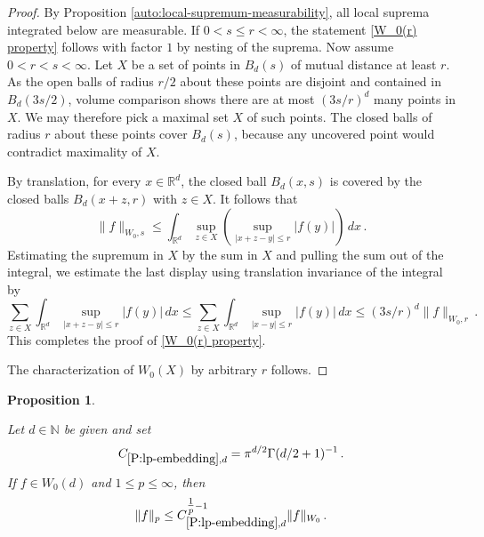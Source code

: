 \documentclass[12pt,reqno]{amsart}
\theoremstyle{plain}
\newtheorem{proposition}[theorem]{Proposition}
\numberwithin{equation}{section}
\theoremstyle{remark}
\newcommand{\uses}[1]{}
\newcommand{\usesdefs}[1]{}
\newcommand{\leanok}{}
\newcommand{\lean}[1]{}
\newcommand{\R}{{\mathbb R}}
\newcommand{\N}{{\mathbb N}}
\begin{document}
\begin{proof}
By Proposition \ref{auto:local-supremum-measurability}, all local suprema integrated below are measurable. If $0<s\le r<\infty$, the statement \eqref{W_0(r) property} follows with factor $1$  by nesting of the suprema. Now assume $0<r<s<\infty.$
Let $X$ be a set of points in $B_d(s)$ of
mutual distance at least $r$. As the open balls of radius $r/2$ about these points are disjoint and contained in $B_d(3s/2)$, volume comparison shows there
are at most $(3s/r)^d$ many points in $X$.
We may therefore pick a maximal set $X$ of such points. The closed balls of radius $r$ about these
points cover $B_d(s)$, because any uncovered point would contradict maximality of $X$.

By translation, for every $x\in \R^d$,
the closed ball $B_d(x,s)$ is covered by the closed balls
$B_d(x+z,r)$ with $z\in X$. It follows that
\begin{equation*}
    \|f\|_{W_0,s}\le \int_{\R^d} \sup_{z\in X} \left(\sup_{|x+z-y|\le r} |f(y)|\right)\,dx\, .
\end{equation*}
Estimating the supremum in $X$ by the sum in $X$ and pulling the sum out of the integral, we estimate the last display using translation invariance of the integral by
\begin{equation*}
         \sum_{z\in X} \int_{\R^d} \sup_{|x+z-y|\le r} |f(y)|\,dx \le \sum_{z\in X} \int_{\R^d} \sup_{|x-y|\le r} |f(y)|\,dx\le (3s/r)^d \|f\|_{W_0,r}\, .
\end{equation*}
This completes the proof of \eqref{W_0(r) property}.


The characterization of $W_0(X)$ by arbitrary $r$ follows.


\end{proof}


\begin{proposition}\label{P:lp-embedding}\uses{}\usesdefs{closed ball,auto:Wiener-space-definition}
\lean{Auto.MemW0.memLp}
\leanok
Let $d\in \N$ be given and set
\begin{equation}\label{auto:Wiener-Lp-embedding-constant}
    C_{\ref{P:lp-embedding},d}=\pi^{d/2}\Gamma(d/2+1)^{-1}\, .
\end{equation}
If $f\in W_0(d)$ and $1\le p\le \infty$, then
\begin{equation}\label{Lp W_0}
\|f\|_p\le C_{\ref{P:lp-embedding},d}^{\tfrac 1p -1}\|f\|_{W_0}    \, .
\end{equation}
\end{proposition}
\end{document}
